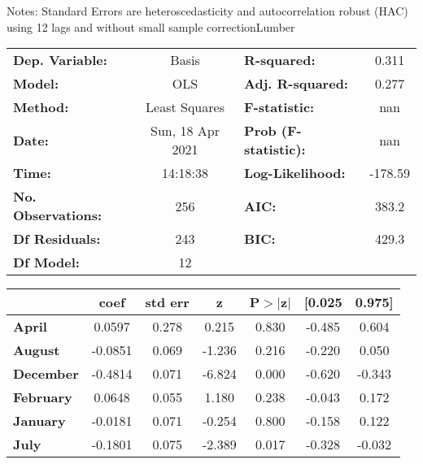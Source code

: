 Notes: \newline
 [1] Standard Errors are heteroscedasticity and autocorrelation robust (HAC) using 12 lags and without small sample correctionLumber\begin{center}
\begin{tabular}{lclc}
\toprule
\textbf{Dep. Variable:}    &      Basis       & \textbf{  R-squared:         } &     0.311   \\
\textbf{Model:}            &       OLS        & \textbf{  Adj. R-squared:    } &     0.277   \\
\textbf{Method:}           &  Least Squares   & \textbf{  F-statistic:       } &       nan   \\
\textbf{Date:}             & Sun, 18 Apr 2021 & \textbf{  Prob (F-statistic):} &      nan    \\
\textbf{Time:}             &     14:18:38     & \textbf{  Log-Likelihood:    } &   -178.59   \\
\textbf{No. Observations:} &         256      & \textbf{  AIC:               } &     383.2   \\
\textbf{Df Residuals:}     &         243      & \textbf{  BIC:               } &     429.3   \\
\textbf{Df Model:}         &          12      & \textbf{                     } &             \\
\bottomrule
\end{tabular}
\begin{tabular}{lcccccc}
                   & \textbf{coef} & \textbf{std err} & \textbf{z} & \textbf{P$> |$z$|$} & \textbf{[0.025} & \textbf{0.975]}  \\
\midrule
\textbf{April}     &       0.0597  &        0.278     &     0.215  &         0.830        &       -0.485    &        0.604     \\
\textbf{August}    &      -0.0851  &        0.069     &    -1.236  &         0.216        &       -0.220    &        0.050     \\
\textbf{December}  &      -0.4814  &        0.071     &    -6.824  &         0.000        &       -0.620    &       -0.343     \\
\textbf{February}  &       0.0648  &        0.055     &     1.180  &         0.238        &       -0.043    &        0.172     \\
\textbf{January}   &      -0.0181  &        0.071     &    -0.254  &         0.800        &       -0.158    &        0.122     \\
\textbf{July}      &      -0.1801  &        0.075     &    -2.389  &         0.017        &       -0.328    &       -0.032     \\

\end{tabular}
\end{center}

